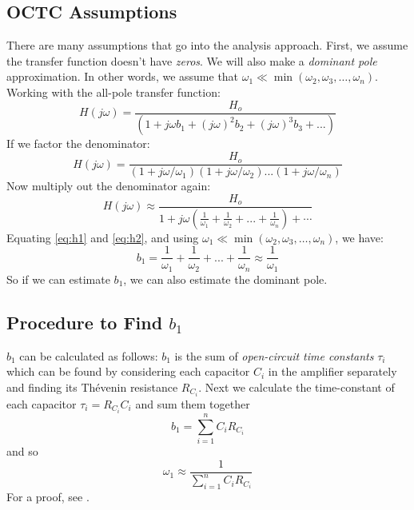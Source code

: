 \subsection{OCTC Assumptions}
There are many assumptions that go into the analysis approach.  First, we assume the transfer function doesn't have \textit{zeros}.  We will also make a  \textit{dominant pole} approximation.  In other words, we assume that $\omega_1 \ll \min(\omega_2, \omega_3, \dots, \omega_n)$. Working with the all-pole transfer function:
    \begin{equation}
        H(j\omega ) = \frac{{{H_o}}}{{\left( {1 + j\omega {b_1} + {{(j\omega )}^2}{b_2} + {{(j\omega )}^3}{b_3} + ...} \right)}}
        \label{eq:h1}
    \end{equation}
If we factor the denominator:
    \begin{equation}
        H(j\omega ) = \frac{{{H_o}}}{{\left( {1 + j\omega /{\omega _1}} \right)\left( {1 + j\omega /{\omega _2}} \right)...\left( {1 + j\omega /{\omega _n}} \right)}}
    \end{equation}
Now multiply out the denominator again:
    \begin{equation}  
        H(j\omega ) \approx \frac{{{H_o}}}{{1 + j\omega \left( {\frac{1}{{{\omega _1}}} + \frac{1}{{{\omega _2}}} + ... + \frac{1}{{{\omega _n}}}} \right) + \cdots }}
        \label{eq:h2}
    \end{equation}
Equating \ref{eq:h1} and \ref{eq:h2}, and using $\omega_1 \ll \min(\omega_2, \omega_3, \dots, \omega_n)$, we have:
    \begin{equation} 
        {b_1} = \frac{1}{{{\omega _1}}} + \frac{1}{{{\omega _2}}} + ... + \frac{1}{{{\omega _n}}} \approx \frac{1}{{{\omega _1}}}
    \end{equation}
So if we can estimate $b_1$, we can also estimate the dominant pole.
\subsection{Procedure to Find \texorpdfstring{$b_1$}{the Dominant Pole}}
$b_1$ can be calculated as follows:  $b_1$ is the sum of \textit{open-circuit time constants} $\tau_i$ which can be found by considering each capacitor $C_i$ in the amplifier separately and finding its Thévenin resistance $R_{C_i}$.  Next we calculate the time-constant of each capacitor $\tau_i = R_{C_i} C_i$ and sum them together
    \begin{equation}
        b_1 = \sum_{i=1}^n C_i R_{C_i} 
    \end{equation}
and so
    \begin{equation}
        \omega_1 \approx \frac{1}{  \sum_{i=1}^n C_i R_{C_i}  }
    \end{equation}
For a proof, see \cite{GrayMeyer}.
